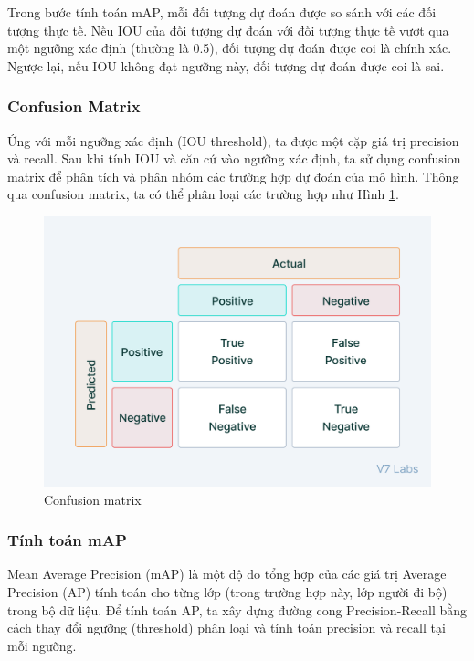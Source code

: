 Trong bước tính toán mAP, mỗi đối tượng dự đoán được so sánh với các đối tượng thực tế. Nếu IOU của đối tượng dự đoán với đối tượng thực tế vượt qua một ngưỡng xác định (thường là 0.5), đối tượng dự đoán được coi là chính xác. Ngược lại, nếu IOU không đạt ngưỡng này, đối tượng dự đoán được coi là sai.

\subsubsection{Confusion Matrix}
Ứng với mỗi ngưỡng xác định (IOU threshold), ta được một cặp giá trị precision và recall. Sau khi tính IOU và căn cứ vào ngưỡng xác định, ta sử dụng confusion matrix để phân tích và phân nhóm các trường hợp dự đoán của mô hình. Thông qua confusion matrix, ta có thể phân loại các trường hợp như Hình \ref{fig:confusion-matrix}.
\graphicspath{{figures/}}
\begin{figure}[h!]
  \centering
    \includegraphics[scale=0.5]{graphics/confusion-matrix.png}
  \caption{Confusion matrix}
  \label{fig:confusion-matrix}
\end{figure}

\subsubsection{Tính toán mAP}
Mean Average Precision (mAP) là một độ đo tổng hợp của các giá trị Average Precision (AP) tính toán cho từng lớp (trong trường hợp này, lớp người đi bộ) trong bộ dữ liệu. Để tính toán AP, ta xây dựng đường cong Precision-Recall bằng cách thay đổi ngưỡng (threshold) phân loại và tính toán precision và recall tại mỗi ngưỡng.

